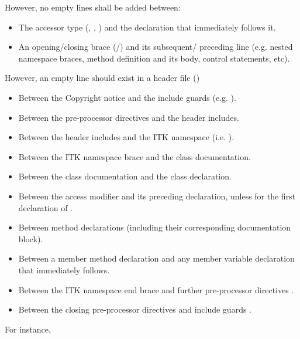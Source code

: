 However, no empty lines shall be added between:
\begin{itemize}
\item The accessor type (, , ) and
the declaration that immediately follows it.
\item An opening/closing brace (\code{\{}/\code{\}}) and its subsequent/
preceding line (e.g. nested namespace braces, method definition and its body,
control statements, etc).
\end{itemize}

However, an empty line should exist in a header file ()
\begin{itemize}
\item Between the Copyright notice and the include guards (e.g.
).
\item Between the pre-processor directives and the header includes.
\item Between the header includes and the ITK namespace (i.e.
).
\item Between the ITK namespace brace and the class documentation.
\item Between the class documentation and the class declaration.
\item Between the access modifier and its preceding declaration, unless for the
first declaration of .
\item Between method declarations (including their corresponding documentation
block).
\item Between a member method declaration and any member variable declaration
that immediately follows.
\item Between the ITK namespace end brace  and
further pre-processor directives .
\item Between the closing pre-processor directives and include guards .
\end{itemize}

For instance,

